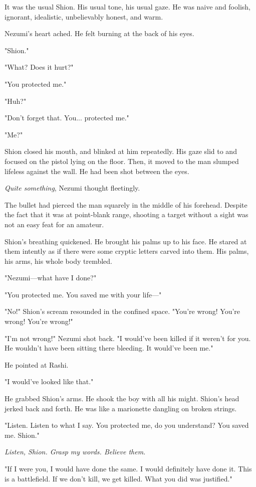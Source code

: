 It was the usual Shion. His usual tone, his usual gaze. He was naive and
foolish, ignorant, idealistic, unbelievably honest, and warm.

Nezumi's heart ached. He felt burning at the back of his eyes.

"Shion."

"What? Does it hurt?"

"You protected me."

"Huh?"

"Don't forget that. You... protected me."

"Me?"

Shion closed his mouth, and blinked at him repeatedly. His gaze slid to
and focused on the pistol lying on the floor. Then, it moved to the man
slumped lifeless against the wall. He had been shot between the eyes.

\emph{Quite something}, Nezumi thought fleetingly.

The bullet had pierced the man squarely in the middle of his forehead.
Despite the fact that it was at point-blank range, shooting a target
without a sight was not an easy feat for an amateur.

Shion's breathing quickened. He brought his palms up to his face. He
stared at them intently as if there were some cryptic letters carved
into them. His palms, his arms, his whole body trembled.

"Nezumi---what have I done?"

"You protected me. You saved me with your life---"

"No!" Shion's scream resounded in the confined space. "You're wrong!
You're wrong! You're wrong!"

"I'm not wrong!" Nezumi shot back. "I would've been killed if it weren't
for you. He wouldn't have been sitting there bleeding. It would've been
me."

He pointed at Rashi.

"I would've looked like that."

He grabbed Shion's arms. He shook the boy with all his might. Shion's
head jerked back and forth. He was like a marionette dangling on broken
strings.

"Listen. Listen to what I say. You protected me, do you understand? You
saved me. Shion."

\emph{Listen, Shion. Grasp my words. Believe them.}

"If I were you, I would have done the same. I would definitely have done
it. This is a battlefield. If we don't kill, we get killed. What you did
was justified."

